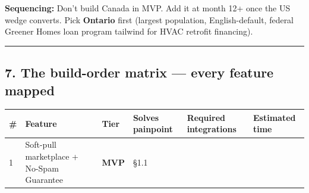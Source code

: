 \documentclass[
  10pt,
]{article}
\begin{document}
\textbf{Sequencing:} Don't build Canada in MVP. Add it at month 12+ once the US wedge converts. Pick
\textbf{Ontario} first (largest population, English-default, federal Greener Homes loan program
tailwind for HVAC retrofit financing).

\begin{center}\rule{0.5\linewidth}{0.5pt}\end{center}

\hypertarget{the-build-order-matrix-every-feature-mapped}{%
\subsection{7. The build-order matrix --- every feature
mapped}\label{the-build-order-matrix-every-feature-mapped}}

\begin{longtable}[]{@{}llllll@{}}
\toprule
\begin{minipage}[b]{0.14\columnwidth}\raggedright
\#\strut
\end{minipage} & \begin{minipage}[b]{0.14\columnwidth}\raggedright
Feature\strut
\end{minipage} & \begin{minipage}[b]{0.14\columnwidth}\raggedright
Tier\strut
\end{minipage} & \begin{minipage}[b]{0.14\columnwidth}\raggedright
Solves painpoint\strut
\end{minipage} & \begin{minipage}[b]{0.14\columnwidth}\raggedright
Required integrations\strut
\end{minipage} & \begin{minipage}[b]{0.14\columnwidth}\raggedright
Estimated time\strut
\end{minipage}\tabularnewline
\midrule
\endhead
\begin{minipage}[t]{0.14\columnwidth}\raggedright
1\strut
\end{minipage} & \begin{minipage}[t]{0.14\columnwidth}\raggedright
Soft-pull marketplace + No-Spam Guarantee\strut
\end{minipage} & \begin{minipage}[t]{0.14\columnwidth}\raggedright
\textbf{MVP}\strut
\end{minipage} & \begin{minipage}[t]{0.14\columnwidth}\raggedright
§1.1\strut
\end{minipage} & \begin{minipage}[t]{0.14\columnwidth}\raggedright

\end{minipage}
\end{longtable}
\end{document}
